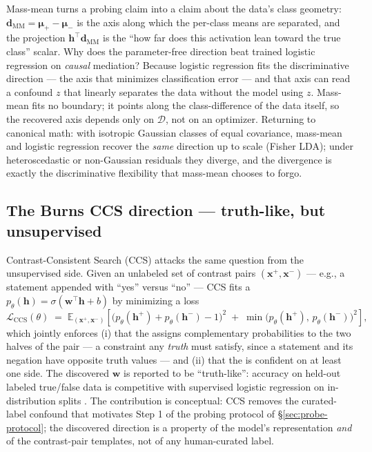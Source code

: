 \begin{intuition}
Mass-mean turns a probing claim into a claim about the data's class
geometry: $\mathbf{d}_\mathrm{MM} = \boldsymbol{\mu}_+ -
\boldsymbol{\mu}_-$ is the axis along which the per-class means are
separated, and the projection $\mathbf{h}^\top \mathbf{d}_\mathrm{MM}$
is the ``how far does this activation lean toward the true class''
scalar. Why does the parameter-free direction beat trained logistic
regression on \emph{causal} mediation? Because logistic regression
fits the discriminative direction --- the axis that minimizes
classification error --- and that axis can read a confound $z$ that
linearly separates the data without the model using $z$. Mass-mean
fits no boundary; it points along the class-difference of the data
itself, so the recovered axis depends only on $\mathcal{D}$, not on
an optimizer. Returning to canonical math: with isotropic Gaussian
classes of equal covariance, mass-mean and logistic regression
recover the \emph{same} direction up to scale (Fisher LDA); under
heteroscedastic or non-Gaussian residuals they diverge, and the
divergence is exactly the discriminative flexibility that mass-mean
chooses to forgo.
\end{intuition}

\subsection{The Burns CCS direction --- truth-like, but unsupervised}
\label{sec:ccs-truth}

Contrast-Consistent Search (CCS)
 attacks the same
question from the unsupervised side. Given an unlabeled set of
contrast pairs $(\mathbf{x}^+, \mathbf{x}^-)$ --- e.g., a statement
appended with ``yes'' versus ``no'' --- CCS fits a 
$p_\theta(\mathbf{h}) = \sigma(\mathbf{w}^\top \mathbf{h} + b)$ by
minimizing a  loss
\begin{equation}
  \mathcal{L}_\mathrm{CCS}(\theta)
  \;=\;
  \mathbb{E}_{(\mathbf{x}^+, \mathbf{x}^-)}\!\left[
    \big(p_\theta(\mathbf{h}^+) + p_\theta(\mathbf{h}^-) - 1\big)^2
    \;+\;
    \min\!\big(p_\theta(\mathbf{h}^+),\, p_\theta(\mathbf{h}^-)\big)^2
  \right],
  \label{eq:ccs-loss}
\end{equation}
which jointly enforces (i) that the  assigns complementary
probabilities to the two halves of the pair --- a constraint any
\emph{truth}  must satisfy, since a statement and its negation
have opposite truth values --- and (ii) that the  is confident
on at least one side. The discovered $\mathbf{w}$ is reported to be
``truth-like'':  accuracy on held-out labeled true/false data is
competitive with supervised logistic regression on in-distribution
splits . The
contribution is conceptual: CCS removes the curated-label confound
that motivates Step 1 of the probing protocol of
\S\ref{sec:probe-protocol}; the discovered direction is a property of
the model's representation \emph{and} of the contrast-pair templates,
not of any human-curated label.

